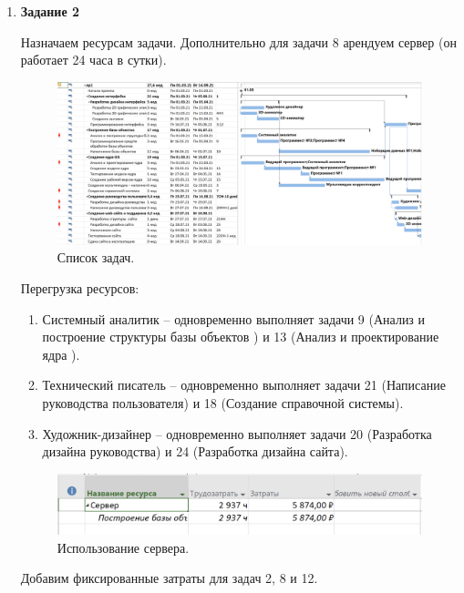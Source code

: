 \documentclass[a4paper,14pt]{extreport} %
\begin{document}
\begin{enumerate}
\item \textbf{Задание 2}

Назначаем ресурсам задачи. Дополнительно для задачи 8 арендуем сервер (он работает 24 часа в сутки). 

\begin{figure}[H]
  \centering
  \caption{Список задач. }
  \includegraphics[scale=0.39]{2}
\end{figure}

Перегрузка ресурсов:
\begin{enumerate}
\item Системный аналитик -- одновременно выполняет задачи 9 (Анализ и построение структуры базы объектов ) и 13 (Анализ и проектирование ядра ).
\item Технический писатель -- одновременно выполняет задачи 21 (Написание руководства пользователя) и 18 (Создание справочной системы).
\item Художник-дизайнер -- одновременно выполняет задачи 20 (Разработка дизайна руководства) и 24 (Разработка дизайна сайта).
\end{enumerate}

\begin{figure}[H]
  \centering
  \caption{Использование сервера. }
  \includegraphics[scale=0.7]{server}
\end{figure}

Добавим фиксированные затраты для задач 2, 8 и 12.


\end{enumerate}
\end{document}
